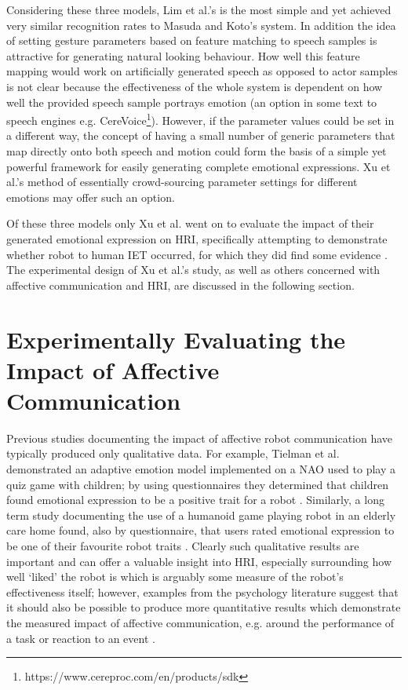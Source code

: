 \documentclass[11pt,a4paper]{report}
\begin{document}
Considering these three models, Lim et al.'s is the most simple and yet achieved very similar recognition rates to Masuda and Koto's system. In addition the idea of setting gesture parameters based on feature matching to speech samples is attractive for generating natural looking behaviour. How well this feature mapping would work on artificially generated speech as opposed to actor samples is not clear because the effectiveness of the whole system is dependent on how well the provided speech sample portrays emotion (an option in some text to speech engines e.g. CereVoice\footnote{https://www.cereproc.com/en/products/sdk}). However, if the parameter values could be set in a different way, the concept of having a small number of generic parameters that map directly onto both speech and motion could form the basis of a simple yet powerful framework for easily generating complete emotional expressions. Xu et al.'s method of essentially crowd-sourcing parameter settings for different emotions may offer such an option. 

Of these three models only Xu et al. went on to evaluate the impact of their generated emotional expression on HRI, specifically attempting to demonstrate whether robot to human IET occurred, for which they did find some evidence \cite{xu2014robot}. The experimental design of Xu et al.'s study, as well as others concerned with affective communication and HRI, are discussed in the following section.

\section{Experimentally Evaluating the Impact of Affective Communication}

Previous studies documenting the impact of affective robot communication have typically produced only qualitative data. For example, Tielman et al. demonstrated an adaptive emotion model implemented on a NAO used to play a quiz game with children; by using questionnaires they determined that children found emotional expression to be a positive trait for a robot \cite{tielman2014adaptive}. Similarly, a long term study documenting the use of a humanoid game playing robot in an elderly care home found, also by questionnaire, that users rated emotional expression to be one of their favourite robot traits \cite{louie2012playing}. Clearly such qualitative results are important and can offer a valuable insight into HRI, especially surrounding how well `liked' the robot is which is arguably some measure of the robot's effectiveness itself; however, examples from the psychology literature suggest that it should also be possible to produce more quantitative results which demonstrate the measured impact of affective communication, e.g. around the performance of a task \cite{barsade2002ripple} or reaction to an event \cite{latane1968group}.
\end{document}
